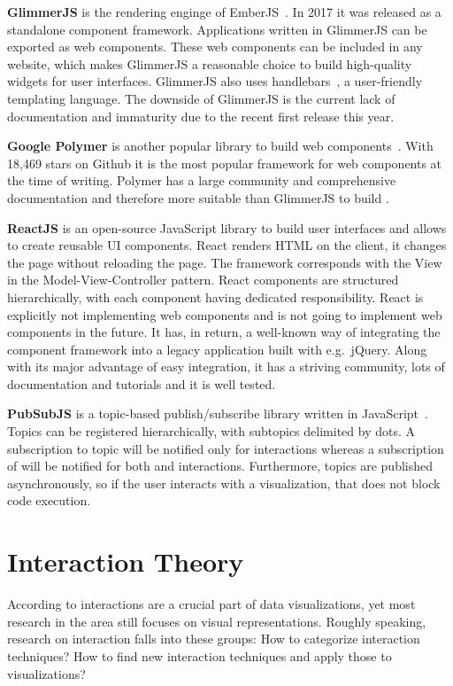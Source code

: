 \textbf{GlimmerJS} is the rendering enginge of EmberJS~\parencite{Glimmer2017}.
In 2017 it was released as a standalone component framework.
Applications written in GlimmerJS can be exported as web components.
These web components can be included in any website, which makes GlimmerJS a reasonable choice to build high-quality widgets for user interfaces.
GlimmerJS also uses handlebars~\parencite{Handlebars2017}, a user-friendly templating language.
The downside of GlimmerJS is the current lack of documentation and immaturity due to the recent first release this year.

\textbf{Google Polymer} is another popular library to build web components~\parencite{Polymer2017}.
With 18,469 stars on Github it is the most popular framework for web components at the time of writing.
Polymer has a large community and comprehensive documentation and therefore more suitable than GlimmerJS to build \cmvs{}.

\textbf{ReactJS} is an open-source JavaScript library to build user interfaces and allows to create reusable UI components.
React renders HTML on the client, it changes the page without reloading the page.
The framework corresponds with the View in the Model-View-Controller pattern.
React components are structured hierarchically, with each component having dedicated responsibility.
React is explicitly not implementing web components and is not going to implement web components in the future.
It has, in return, a well-known way of integrating the component framework into a legacy application built with e.g.\ jQuery.
Along with its major advantage of easy integration, it has a striving community, lots of documentation and tutorials and it is well tested.

\textbf{PubSubJS} is a topic-based publish/subscribe library written in JavaScript~\parencite{PubSubJS2017}.
Topics can be registered hierarchically, with subtopics delimited by dots.
A subscription to topic  will be notified only for  interactions whereas a subscription of  will be notified for both  and  interactions.
Furthermore, topics are published asynchronously, so if the user interacts with a visualization, that does not block code execution.




\section{Interaction Theory}\label{sec:related-work:interaction-theory}
According to \textcite{Ho2013} interactions are a crucial part of data visualizations, yet most research in the area still focuses on visual representations.
Roughly speaking, research on interaction falls into these groups:
How to categorize interaction techniques?
How to find new interaction techniques and apply those to visualizations?

